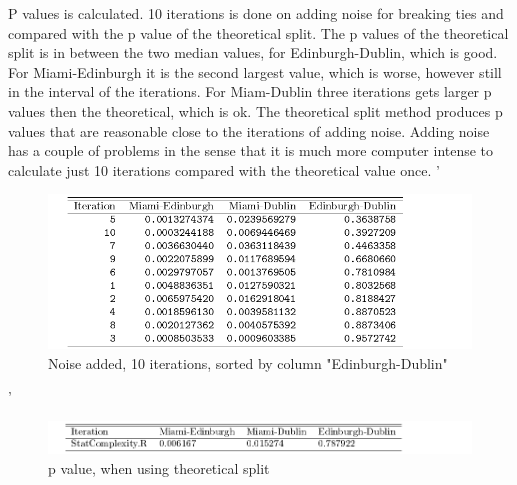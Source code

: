 P values is calculated. 10 iterations is done on adding noise for breaking ties and compared with the p value of the theoretical split. The p values of the theoretical split is in between the two median values, for Edinburgh-Dublin, which is good. For Miami-Edinburgh it is the second largest value, which is worse, however still in the interval of the iterations. For Miam-Dublin three iterations gets larger p values then the theoretical, which is ok. The theoretical split method produces p values that are reasonable close to the iterations of adding noise. Adding noise has a couple of problems in the sense that it is much more computer intense to calculate just 10 iterations compared with the theoretical value once.
'\begin{figure}
    \centering
    \includegraphics[width=\textwidth,keepaspectratio]{Weather/pValuesTheoretical,10=Iterations,Sorted.pdf}
    \caption{Noise added, 10 iterations, sorted by column "Edinburgh-Dublin"}
\end{figure}

'\begin{figure}
    \centering
    \includegraphics[width=\textwidth,keepaspectratio]{Weather/pValuesTheoretical.pdf}
    \caption{p value, when using theoretical split}
\end{figure}

